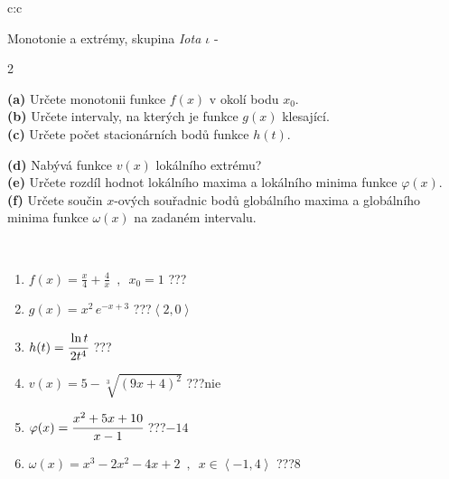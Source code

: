 \documentclass[10pt]{report}
\begin{document}
\newpage
\thispagestyle{empty}
\begin{tabular}{c:c}
\begin{minipage}[c][104.5mm][t]{0.5\linewidth}
\begin{center}
\vspace{7mm}
{\huge Monotonie a extrémy, skupina \textit{Iota $\iota$} -}\\[5mm]
\begin{minipage}{0.95\linewidth}
\begin{center}
{\small \begin{multicols}{2} \raggedright
\textbf{(a)} Určete monotonii funkce \(f(x)\) v okolí bodu \(x_0\). \\[1mm]
\textbf{(b)} Určete intervaly, na kterých je funkce \(g(x)\) klesající. \\[1mm]
\textbf{(c)} Určete počet stacionárních bodů funkce \(h(t)\). \par \columnbreak
\textbf{(d)} Nabývá funkce \(v(x)\) lokálního extrému? \\[1mm]
\textbf{(e)} Určete rozdíl hodnot lokálního maxima a lokálního minima funkce \(\varphi(x)\). \\[1mm]
\textbf{(f)} Určete součin \(x\)-ových souřadnic bodů globálního maxima a globálního minima funkce \(\omega(x)\) na zadaném intervalu. \\[1mm]
\end{multicols}
}
\end{center}
\end{minipage}
\\[4mm]
\begin{minipage}{0.79\linewidth}
\begin{center}
\begin{varwidth}{\linewidth}
\begin{enumerate}
\normalsize
\item $f(x)=\frac{x}{4}+\frac{4}{x} \enspace , \enspace x_0=1$\quad \dotfill\; ???\;\dotfill \quad {}
\item $g(x)=x^2\, e^{-x+3}$\quad \dotfill\; ???\;\dotfill \quad $\left\langle2 , 0\right\rangle$
\item $h(t)=\cfrac{\ln t}{2t^4}$\quad \dotfill\; ???\;\dotfill {}
\item $v(x)=5-\sqrt[3]{(9x+4)^2}$\quad \dotfill\; ???\;\dotfill \quad $\text{nie}$
\item $\varphi(x)=\cfrac{x^2+5x+10}{x-1}$\quad \dotfill\; ???\;\dotfill \quad $-14$
\item $\omega(x)=x^3-2x^2-4x+2 \enspace , \enspace x\in\left\langle-1 , 4\right\rangle$\quad \dotfill\; ???\;\dotfill \quad $8$

\end{enumerate}
\end{varwidth}
\end{center}
\end{minipage}
\end{center}
\end{minipage}
\end{tabular}
\end{document}
